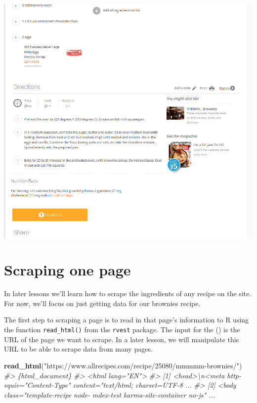 \documentclass[
  12pt,
]{book}
\newenvironment{Shaded}{\begin{snugshade}}{\end{snugshade}}
\newcommand{\CommentTok}[1]{\textcolor[rgb]{0.37,0.37,0.37}{\textit{#1}}}
\newcommand{\KeywordTok}[1]{\textcolor[rgb]{0.27,0.27,0.27}{\textbf{#1}}}
\newcommand{\NormalTok}[1]{#1}
\newcommand{\StringTok}[1]{\textcolor[rgb]{0.5,0.5,0.5}{#1}}
\begin{document}
\includegraphics{images/brownies_2.PNG}

\hypertarget{scraping-one-page}{%
\section{Scraping one page}\label{scraping-one-page}}

In later lessons we'll learn how to scrape the ingredients of any recipe on the site. For now, we'll focus on just getting data for our brownies recipe.

The first step to scraping a page is to read in that page's information to R using the function \texttt{read\_html()} from the \texttt{rvest} package. The input for the () is the URL of the page we want to scrape. In a later lesson, we will manipulate this URL to be able to scrape data from many pages.

\begin{Shaded}
\begin{Highlighting}[]
\KeywordTok{read\_html}\NormalTok{(}\StringTok{"https://www.allrecipes.com/recipe/25080/mmmmm{-}brownies/"}\NormalTok{)}
\CommentTok{\#> \{html\_document\}}
\CommentTok{\#> <html lang="EN">}
\CommentTok{\#> [1] <head>\textbackslash{}n<meta http{-}equiv="Content{-}Type" content="text/html; charset=UTF{-}8 ...}
\CommentTok{\#> [2] <body class="template{-}recipe node{-} mdex{-}test karma{-}site{-}container no{-}js"  ...}
\end{Highlighting}
\end{Shaded}
\end{document}
